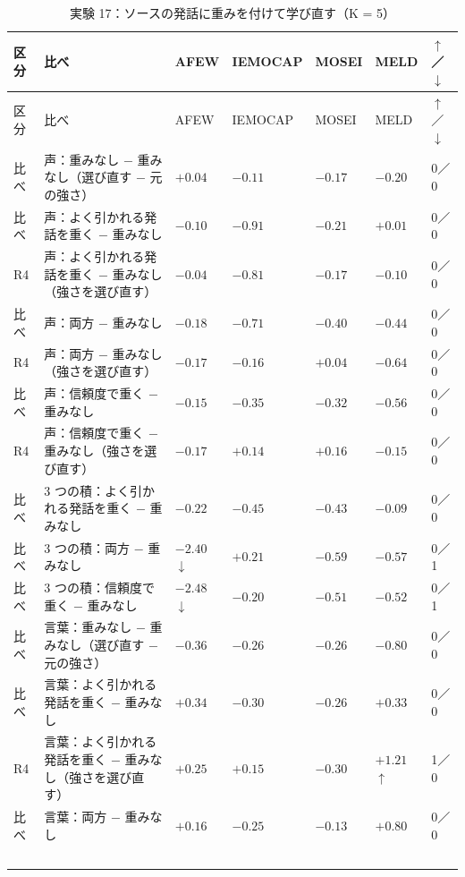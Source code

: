 \begin{longtable}{>{\raggedright}p{0.75cm}>{\raggedright}p{5.6cm}>{\raggedright}p{2.05cm}>{\raggedright}p{2.05cm}>{\raggedright}p{2.05cm}>{\raggedright}p{2.05cm}p{0.75cm}}
\caption{実験 17：ソースの発話に重みを付けて学び直す（K = 5）}\\
\toprule
区分 & 比べ & AFEW & IEMOCAP & MOSEI & MELD & $\uparrow$／$\downarrow$ \\
\midrule
\endfirsthead
\toprule
区分 & 比べ & AFEW & IEMOCAP & MOSEI & MELD & $\uparrow$／$\downarrow$ \\
\midrule
\endhead
\bottomrule
\endfoot

比べ & 声：重みなし $-$ 重みなし（選び直す $-$ 元の強さ） & $+0.04$ & $-0.11$ & $-0.17$ & $-0.20$ & 0／0 \\
比べ & 声：よく引かれる発話を重く $-$ 重みなし & $-0.10$ & $-0.91$ & $-0.21$ & $+0.01$ & 0／0 \\
R4 & 声：よく引かれる発話を重く $-$ 重みなし（強さを選び直す） & $-0.04$ & $-0.81$ & $-0.17$ & $-0.10$ & 0／0 \\
比べ & 声：両方 $-$ 重みなし & $-0.18$ & $-0.71$ & $-0.40$ & $-0.44$ & 0／0 \\
R4 & 声：両方 $-$ 重みなし（強さを選び直す） & $-0.17$ & $-0.16$ & $+0.04$ & $-0.64$ & 0／0 \\
比べ & 声：信頼度で重く $-$ 重みなし & $-0.15$ & $-0.35$ & $-0.32$ & $-0.56$ & 0／0 \\
R4 & 声：信頼度で重く $-$ 重みなし（強さを選び直す） & $-0.17$ & $+0.14$ & $+0.16$ & $-0.15$ & 0／0 \\
比べ & 3 つの積：よく引かれる発話を重く $-$ 重みなし & $-0.22$ & $-0.45$ & $-0.43$ & $-0.09$ & 0／0 \\
比べ & 3 つの積：両方 $-$ 重みなし & $-2.40$$\downarrow$ & $+0.21$ & $-0.59$ & $-0.57$ & 0／1 \\
比べ & 3 つの積：信頼度で重く $-$ 重みなし & $-2.48$$\downarrow$ & $-0.20$ & $-0.51$ & $-0.52$ & 0／1 \\
比べ & 言葉：重みなし $-$ 重みなし（選び直す $-$ 元の強さ） & $-0.36$ & $-0.26$ & $-0.26$ & $-0.80$ & 0／0 \\
比べ & 言葉：よく引かれる発話を重く $-$ 重みなし & $+0.34$ & $-0.30$ & $-0.26$ & $+0.33$ & 0／0 \\
R4 & 言葉：よく引かれる発話を重く $-$ 重みなし（強さを選び直す） & $+0.25$ & $+0.15$ & $-0.30$ & $+1.21$$\uparrow$ & 1／0 \\
比べ & 言葉：両方 $-$ 重みなし & $+0.16$ & $-0.25$ & $-0.13$ & $+0.80$ & 0／0 \\
$$
\end{longtable}
